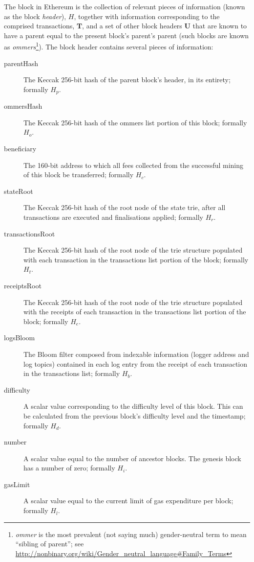 \documentclass[9pt,oneside]{amsart}
\begin{document}
\begin{multicols}{2}
The block in Ethereum is the collection of relevant pieces of information (known as the block \textit{header}), $H$, together with information corresponding to the comprised transactions, $\mathbf{T}$, and a set of other block headers $\mathbf{U}$ that are known to have a parent equal to the present block's parent's parent (such blocks are known as \textit{ommers}\footnote{\textit{ommer} is the most prevalent (not saying much) gender-neutral term to mean ``sibling of parent''; see \url{http://nonbinary.org/wiki/Gender_neutral_language#Family_Terms}}). The block header contains several pieces of information:


\begin{description}
\item[parentHash] The Keccak 256-bit hash of the parent block's header, in its entirety; formally $H_p$.
\item[ommersHash] The Keccak 256-bit hash of the ommers list portion of this block; formally $H_o$.
\item[beneficiary] The 160-bit address to which all fees collected from the successful mining of this block be transferred; formally $H_c$.
\item[stateRoot] The Keccak 256-bit hash of the root node of the state trie, after all transactions are executed and finalisations applied; formally $H_r$.
\item[transactionsRoot] The Keccak 256-bit hash of the root node of the trie structure populated with each transaction in the transactions list portion of the block; formally $H_t$.
\item[receiptsRoot] The Keccak 256-bit hash of the root node of the trie structure populated with the receipts of each transaction in the transactions list portion of the block; formally $H_e$.
\item[logsBloom] The Bloom filter composed from indexable information (logger address and log topics) contained in each log entry from the receipt of each transaction in the transactions list; formally $H_b$.
\item[difficulty] A scalar value corresponding to the difficulty level of this block. This can be calculated from the previous block's difficulty level and the timestamp; formally $H_d$.
\item[number] A scalar value equal to the number of ancestor blocks. The genesis block has a number of zero; formally $H_i$.
\item[gasLimit] A scalar value equal to the current limit of gas expenditure per block; formally $H_l$.

\end{description}
\end{multicols}
\end{document}
